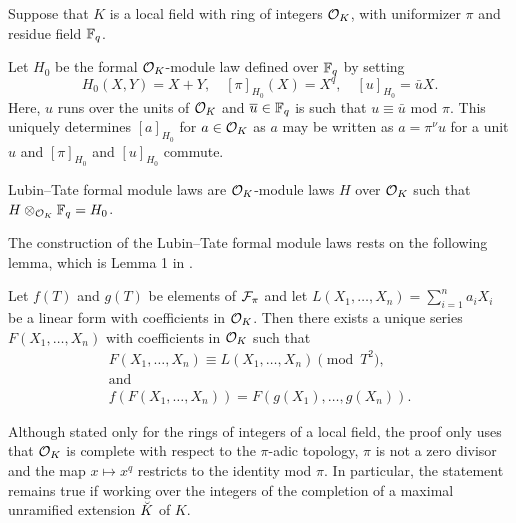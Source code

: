 Suppose that $K$ is a local field with ring of integers $\mathcal{O}_K$, with uniformizer
$\pi$ and residue field $\mathbb{F}_q$. 

Let $H_0$ be the formal $\mathcal{O}_K$-module law defined over $\mathbb{F}_q$ by setting
\begin{equation*}
  H_0(X,Y) = X + Y, \quad [\pi]_{H_0}(X) = X^q, \quad [u]_{H_0}= \bar u X.
\end{equation*}
Here, $u$ runs over the units of $\mathcal{O}_K$ and $\overline u \in \mathbb{F}_q$ is such that 
$u \equiv \bar u$ mod $\pi$. This uniquely determines $[a]_{H_0}$ 
for $a \in \mathcal{O}_K$ as $a$ may be written as $a = \pi^{\nu} u$ for a unit $u$ and
$[\pi]_{H_0}$ and $[u]_{H_0}$ commute. 

Lubin--Tate formal module laws are $\mathcal{O}_K$-module laws $H$ over $\mathcal{O}_K$ such that 
$H \otimes_{\mathcal{O}_K} \mathbb{F}_q = H_0$. 

The construction of the Lubin--Tate formal module laws rests on the following 
lemma, which is Lemma 1 in \cite{LubinTateFormalMult}.
\begin{lem}\label{lem:LTLemma1}
  Let $f(T)$ and $g(T)$ be elements of $\mathcal{F}_\pi$ and let 
  $L(X_1, \dots, X_n) = \sum_{i=1}^n a_i X_i$ be a linear form with coefficients in 
  $\mathcal{O}_K$. Then there exists a unique series $F(X_1, \dots, X_n)$ with coefficients 
  in $\mathcal{O}_K$ such that 
  \begin{gather*}
    F(X_1, \dots, X_n) \equiv L(X_1, \dots, X_n) \pmod {T^2}, \\ \text{and} \\
    f(F(X_1, \dots, X_n)) = F(g(X_1), \dots, g(X_n)).
  \end{gather*}
\end{lem}
Although stated only for the rings of integers of a local field, the proof only
uses that $\mathcal{O}_K$ is complete with respect to the $\pi$-adic topology, $\pi$ is
not a zero divisor and the map $x \mapsto x^q$ restricts to the identity mod $\pi$.
In particular, the statement remains true if working over the integers of the
completion of a maximal unramified extension ${\breve {K}}$ of $K$.

